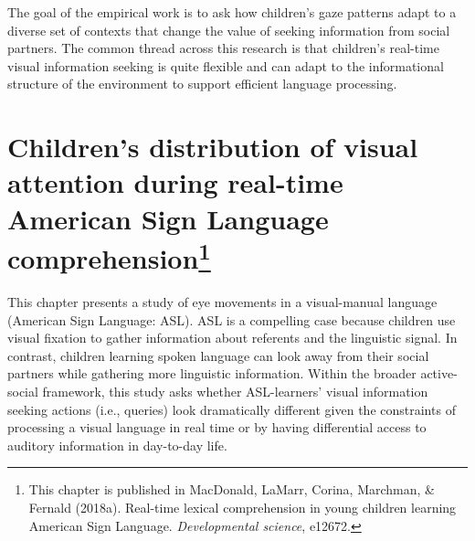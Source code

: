 \documentclass[oneside]{report}
\begin{document}
The goal of the empirical work is to ask how children's gaze patterns
adapt to a diverse set of contexts that change the value of seeking
information from social partners. The common thread across this research
is that children's real-time visual information seeking is quite
flexible and can adapt to the informational structure of the environment
to support efficient language processing.

\chapter[Children's distribution of visual attention during real-time
American Sign Language comprehension]{\texorpdfstring{Children's
distribution of visual attention during real-time American Sign Language
comprehension\footnote{This chapter is published in MacDonald, LaMarr,
  Corina, Marchman, \& Fernald (2018a). Real-time lexical comprehension
  in young children learning American Sign Language. \emph{Developmental
  science}, e12672.}}{Children's distribution of visual attention during real-time American Sign Language comprehension}}\label{childrens-distribution-of-visual-attention-during-real-time-american-sign-language-comprehension}


This chapter presents a study of eye movements in a visual-manual
language (American Sign Language: ASL). ASL is a compelling case because
children use visual fixation to gather information about referents and
the linguistic signal. In contrast, children learning spoken language
can look away from their social partners while gathering more linguistic
information. Within the broader active-social framework, this study asks
whether ASL-learners' visual information seeking actions (i.e., queries)
look dramatically different given the constraints of processing a visual
language in real time or by having differential access to auditory
information in day-to-day life.
\end{document}
